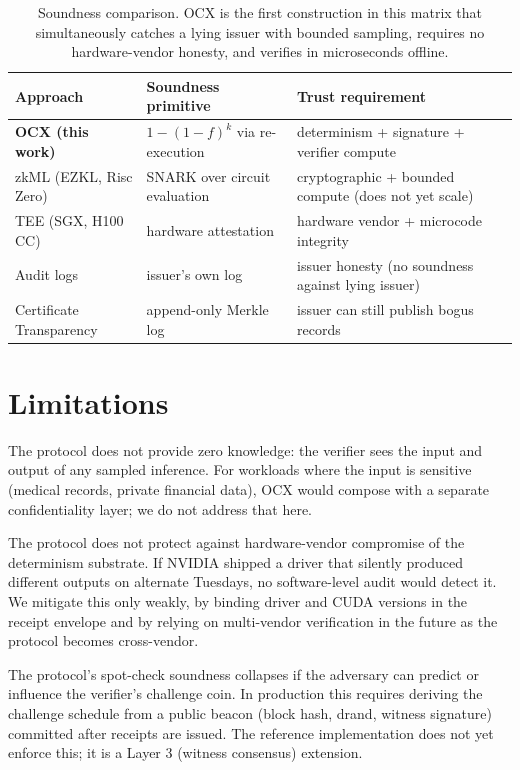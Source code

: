 \documentclass[10pt]{article}
\begin{document}
\begin{table}[h]
\centering
\small
\begin{tabular}{lll}
\toprule
Approach & Soundness primitive & Trust requirement \\
\midrule
\textbf{OCX (this work)} & $1 - (1-f)^k$ via re-execution & determinism + signature + verifier compute \\
zkML (EZKL, Risc Zero) & SNARK over circuit evaluation & cryptographic + bounded compute (does not yet scale) \\
TEE (SGX, H100 CC) & hardware attestation & hardware vendor + microcode integrity \\
Audit logs & issuer's own log & issuer honesty (no soundness against lying issuer) \\
Certificate Transparency & append-only Merkle log & issuer can still publish bogus records \\
\bottomrule
\end{tabular}
\caption{Soundness comparison. OCX is the first construction in this matrix that simultaneously catches a lying issuer with bounded sampling, requires no hardware-vendor honesty, and verifies in microseconds offline.}
\end{table}

\section{Limitations}
\label{sec:limitations}

The protocol does not provide zero knowledge: the verifier sees the input and output of any sampled inference. For workloads where the input is sensitive (medical records, private financial data), OCX would compose with a separate confidentiality layer; we do not address that here.

The protocol does not protect against hardware-vendor compromise of the determinism substrate. If NVIDIA shipped a driver that silently produced different outputs on alternate Tuesdays, no software-level audit would detect it. We mitigate this only weakly, by binding driver and CUDA versions in the receipt envelope and by relying on multi-vendor verification in the future as the protocol becomes cross-vendor.

The protocol's spot-check soundness collapses if the adversary can predict or influence the verifier's challenge coin. In production this requires deriving the challenge schedule from a public beacon (block hash, drand, witness signature) committed after receipts are issued. The reference implementation does not yet enforce this; it is a Layer 3 (witness consensus) extension.
\end{document}
